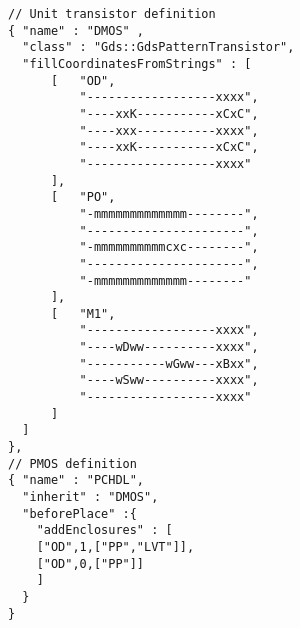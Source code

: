 \documentclass[crop]{standalone}
\begin{document}
\begin{lstlisting}[style=json]
// Unit transistor definition
{ "name" : "DMOS" ,
  "class" : "Gds::GdsPatternTransistor",
  "fillCoordinatesFromStrings" : [
      [   "OD",
          "------------------xxxx",
          "----xxK-----------xCxC",
          "----xxx-----------xxxx",
          "----xxK-----------xCxC",
          "------------------xxxx"
      ],
      [   "PO",
          "-mmmmmmmmmmmmm--------",
          "----------------------",
          "-mmmmmmmmmmcxc--------",
          "----------------------",
          "-mmmmmmmmmmmmm--------"
      ],
      [   "M1",
          "------------------xxxx",
          "----wDww----------xxxx",
          "-----------wGww---xBxx",
          "----wSww----------xxxx",
          "------------------xxxx"
      ]
  ]
},
// PMOS definition
{ "name" : "PCHDL", 
  "inherit" : "DMOS",
  "beforePlace" :{
    "addEnclosures" : [
    ["OD",1,["PP","LVT"]],
    ["OD",0,["PP"]]
    ]
  }
}
\end{lstlisting}
\end{document}

